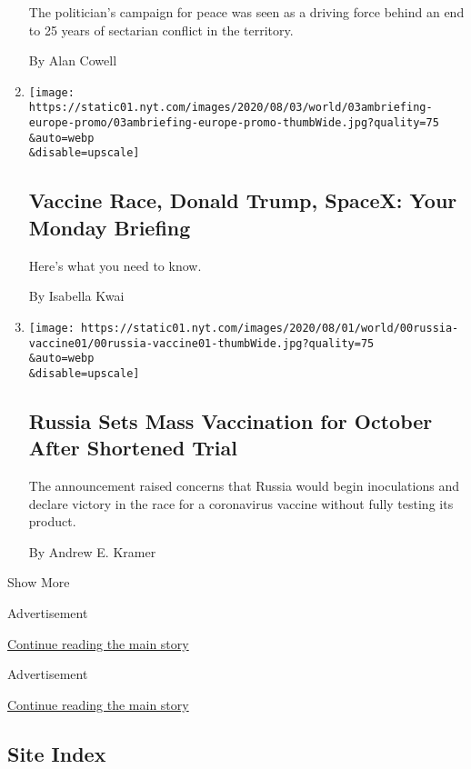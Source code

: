 \begin{enumerate}
  The politician's campaign for peace was seen as a driving force behind
  an end to 25 years of sectarian conflict in the territory.

  By Alan Cowell
\item
  \href{/2020/08/02/briefing/vaccine-race-donald-trump-spacex.html}{}

  \texttt{[image: https://static01.nyt.com/images/2020/08/03/world/03ambriefing-europe-promo/03ambriefing-europe-promo-thumbWide.jpg?quality=75\\\&auto=webp\\\&disable=upscale]}

  \hypertarget{vaccine-race-donald-trump-spacex-your-monday-briefing}{%
  \subsection{Vaccine Race, Donald Trump, SpaceX: Your Monday
  Briefing}\label{vaccine-race-donald-trump-spacex-your-monday-briefing}}

  Here's what you need to know.

  By Isabella Kwai
\item
  \href{/2020/08/02/world/europe/russia-trials-vaccine-October.html}{}

  \texttt{[image: https://static01.nyt.com/images/2020/08/01/world/00russia-vaccine01/00russia-vaccine01-thumbWide.jpg?quality=75\\\&auto=webp\\\&disable=upscale]}

  \hypertarget{russia-sets-mass-vaccination-for-october-after-shortened-trial}{%
  \subsection{Russia Sets Mass Vaccination for October After Shortened
  Trial}\label{russia-sets-mass-vaccination-for-october-after-shortened-trial}}

  The announcement raised concerns that Russia would begin inoculations
  and declare victory in the race for a coronavirus vaccine without
  fully testing its product.

  By Andrew E. Kramer
\end{enumerate}

Show More

Advertisement

\protect\hyperlink{after-mid1}{Continue reading the main story}

Advertisement

\protect\hyperlink{after-mktg}{Continue reading the main story}

\hypertarget{site-index}{%
\subsection{Site Index}\label{site-index}}

